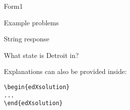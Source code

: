 
\begin{edXchapter}{Form1}


\begin{edXsection}{Example problems}

\begin{edXvertical}
%
% 
%
%
%


\begin{edXproblem}{String response}

What state is Detroit in?


\begin{edXsolution}

Explanations can also be provided inside:
\begin{verbatim}
\begin{edXsolution}
... 
\end{edXsolution}
\end{verbatim}

\end{edXsolution}

\end{edXproblem}



\end{edXvertical}
\end{edXsection}
\end{edXchapter}
